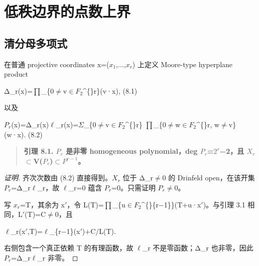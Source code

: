 \documentclass[11pt]{ctexart}
\begin{document}
\section{低秩边界的点数上界}

\subsection{清分母多项式}

在普通 projective coordinates x=(\ensuremath{x_1},\ensuremath{\ldots},\ensuremath{x_{r}}) 上定义 Moore-type hyperplane product

Δ\_r(x)=\ensuremath{\prod}\_\{0\ensuremath{\ne}v\ensuremath{\in}\ensuremath{F_2}\textasciicircum\{\}r\}(v·x),    (8.1)

以及

\ensuremath{P_{r}}(x)=Δ\_r(x)\ensuremath{\ell}\_r(x)=\ensuremath{\Sigma}\_\{0\ensuremath{\ne}v\ensuremath{\in}\ensuremath{F_2}\textasciicircum\{\}r\} \ensuremath{\prod}\_\{0\ensuremath{\ne}w\ensuremath{\in}\ensuremath{F_2}\textasciicircum\{\}r, w\ensuremath{\ne}v\}(w·x).    (8.2)

\begin{quote}\textbf{引理 8.1. \ensuremath{P_{r}} 是非零 homogeneous polynomial，deg \ensuremath{P_{r}}=\ensuremath{2^{r}}−2，且 \ensuremath{X_{r}}\ensuremath{\subset}V(\ensuremath{P_{r}})\ensuremath{\subset}\ensuremath{P^{r−1}}。}\end{quote}

\begin{proof}[证明] 

齐次次数由 (8.2) 直接得到。\ensuremath{X_{r}} 位于 Δ\_r\ensuremath{\ne}0 的 Drinfeld open，在该开集 \ensuremath{P_{r}}=Δ\_r\ensuremath{\ell}\_r，故 \ensuremath{\ell}\_r=0 蕴含 \ensuremath{P_{r}}=0。只需证明 \ensuremath{P_{r}}\ensuremath{\ne}0。

写 \ensuremath{x_{r}}=T，其余为 x\ensuremath{\prime}，令 L(T)=\ensuremath{\prod}\_\{u\ensuremath{\in}\ensuremath{F_2}\textasciicircum\{\}\{r−1\}\}(T+u·x\ensuremath{\prime})。与引理 3.1 相同，L\ensuremath{\prime}(T)=C\ensuremath{\ne}0，且

\ensuremath{\ell}\_r(x\ensuremath{\prime},T)=\ensuremath{\ell}\_\{r−1\}(x\ensuremath{\prime})+C/L(T).

右侧包含一个真正依赖 T 的有理函数，故 \ensuremath{\ell}\_r 不是零函数；Δ\_r 也非零，因此 \ensuremath{P_{r}}=Δ\_r\ensuremath{\ell}\_r 非零。

\end{proof}
\end{document}
